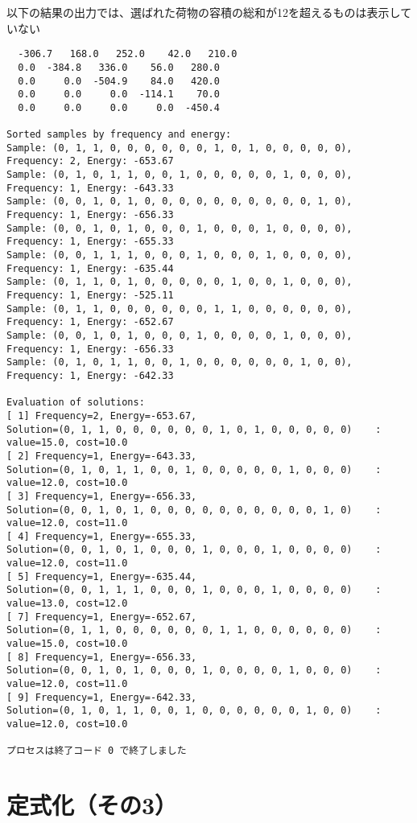 \documentclass[uplatex,dvipdfmx,a4paper,11pt,oneside,openany]{jsbook}
\begin{document}
以下の結果の出力では、選ばれた荷物の容積の総和が12を超えるものは表示していない

\begin{verbatim}
  -306.7   168.0   252.0    42.0   210.0
  0.0  -384.8   336.0    56.0   280.0
  0.0     0.0  -504.9    84.0   420.0
  0.0     0.0     0.0  -114.1    70.0
  0.0     0.0     0.0     0.0  -450.4

Sorted samples by frequency and energy:
Sample: (0, 1, 1, 0, 0, 0, 0, 0, 0, 1, 0, 1, 0, 0, 0, 0, 0), Frequency: 2, Energy: -653.67
Sample: (0, 1, 0, 1, 1, 0, 0, 1, 0, 0, 0, 0, 0, 1, 0, 0, 0), Frequency: 1, Energy: -643.33
Sample: (0, 0, 1, 0, 1, 0, 0, 0, 0, 0, 0, 0, 0, 0, 0, 1, 0), Frequency: 1, Energy: -656.33
Sample: (0, 0, 1, 0, 1, 0, 0, 0, 1, 0, 0, 0, 1, 0, 0, 0, 0), Frequency: 1, Energy: -655.33
Sample: (0, 0, 1, 1, 1, 0, 0, 0, 1, 0, 0, 0, 1, 0, 0, 0, 0), Frequency: 1, Energy: -635.44
Sample: (0, 1, 1, 0, 1, 0, 0, 0, 0, 0, 1, 0, 0, 1, 0, 0, 0), Frequency: 1, Energy: -525.11
Sample: (0, 1, 1, 0, 0, 0, 0, 0, 0, 1, 1, 0, 0, 0, 0, 0, 0), Frequency: 1, Energy: -652.67
Sample: (0, 0, 1, 0, 1, 0, 0, 0, 1, 0, 0, 0, 0, 1, 0, 0, 0), Frequency: 1, Energy: -656.33
Sample: (0, 1, 0, 1, 1, 0, 0, 1, 0, 0, 0, 0, 0, 0, 1, 0, 0), Frequency: 1, Energy: -642.33

Evaluation of solutions:
[ 1] Frequency=2, Energy=-653.67,
Solution=(0, 1, 1, 0, 0, 0, 0, 0, 0, 1, 0, 1, 0, 0, 0, 0, 0)	: value=15.0, cost=10.0
[ 2] Frequency=1, Energy=-643.33,
Solution=(0, 1, 0, 1, 1, 0, 0, 1, 0, 0, 0, 0, 0, 1, 0, 0, 0)	: value=12.0, cost=10.0
[ 3] Frequency=1, Energy=-656.33,
Solution=(0, 0, 1, 0, 1, 0, 0, 0, 0, 0, 0, 0, 0, 0, 0, 1, 0)	: value=12.0, cost=11.0
[ 4] Frequency=1, Energy=-655.33,
Solution=(0, 0, 1, 0, 1, 0, 0, 0, 1, 0, 0, 0, 1, 0, 0, 0, 0)	: value=12.0, cost=11.0
[ 5] Frequency=1, Energy=-635.44,
Solution=(0, 0, 1, 1, 1, 0, 0, 0, 1, 0, 0, 0, 1, 0, 0, 0, 0)	: value=13.0, cost=12.0
[ 7] Frequency=1, Energy=-652.67,
Solution=(0, 1, 1, 0, 0, 0, 0, 0, 0, 1, 1, 0, 0, 0, 0, 0, 0)	: value=15.0, cost=10.0
[ 8] Frequency=1, Energy=-656.33,
Solution=(0, 0, 1, 0, 1, 0, 0, 0, 1, 0, 0, 0, 0, 1, 0, 0, 0)	: value=12.0, cost=11.0
[ 9] Frequency=1, Energy=-642.33,
Solution=(0, 1, 0, 1, 1, 0, 0, 1, 0, 0, 0, 0, 0, 0, 1, 0, 0)	: value=12.0, cost=10.0

プロセスは終了コード 0 で終了しました
\end{verbatim}

\section{定式化（その3）}
\end{document}
